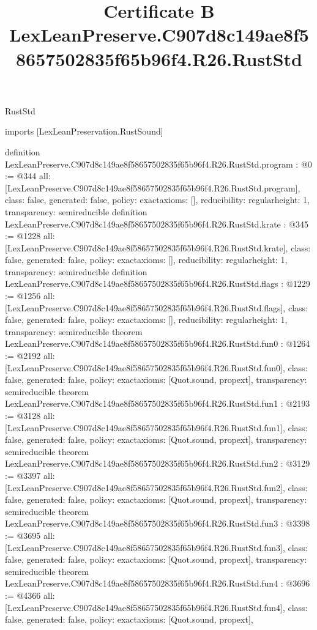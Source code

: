 \begin{lexlean}{RustStd}
\title{Certificate B LexLeanPreserve.C907d8c149ae8f58657502835f65b96f4.R26.RustStd}
\begin{coremodule}
imports [LexLeanPreservation.RustSound]

definition LexLeanPreserve.C907d8c149ae8f58657502835f65b96f4.R26.RustStd.program : @0 := @344 {
  all: [LexLeanPreserve.C907d8c149ae8f58657502835f65b96f4.R26.RustStd.program],
  class: false,
  generated: false,
  policy: exact{axioms: []},
  reducibility: regular{height: 1},
  transparency: semireducible
}
definition LexLeanPreserve.C907d8c149ae8f58657502835f65b96f4.R26.RustStd.krate : @345 := @1228 {
  all: [LexLeanPreserve.C907d8c149ae8f58657502835f65b96f4.R26.RustStd.krate],
  class: false,
  generated: false,
  policy: exact{axioms: []},
  reducibility: regular{height: 1},
  transparency: semireducible
}
definition LexLeanPreserve.C907d8c149ae8f58657502835f65b96f4.R26.RustStd.flags : @1229 := @1256 {
  all: [LexLeanPreserve.C907d8c149ae8f58657502835f65b96f4.R26.RustStd.flags],
  class: false,
  generated: false,
  policy: exact{axioms: []},
  reducibility: regular{height: 1},
  transparency: semireducible
}
theorem LexLeanPreserve.C907d8c149ae8f58657502835f65b96f4.R26.RustStd.fun0 : @1264 := @2192 {
  all: [LexLeanPreserve.C907d8c149ae8f58657502835f65b96f4.R26.RustStd.fun0],
  class: false,
  generated: false,
  policy: exact{axioms: [Quot.sound, propext]},
  transparency: semireducible
}
theorem LexLeanPreserve.C907d8c149ae8f58657502835f65b96f4.R26.RustStd.fun1 : @2193 := @3128 {
  all: [LexLeanPreserve.C907d8c149ae8f58657502835f65b96f4.R26.RustStd.fun1],
  class: false,
  generated: false,
  policy: exact{axioms: [Quot.sound, propext]},
  transparency: semireducible
}
theorem LexLeanPreserve.C907d8c149ae8f58657502835f65b96f4.R26.RustStd.fun2 : @3129 := @3397 {
  all: [LexLeanPreserve.C907d8c149ae8f58657502835f65b96f4.R26.RustStd.fun2],
  class: false,
  generated: false,
  policy: exact{axioms: [Quot.sound, propext]},
  transparency: semireducible
}
theorem LexLeanPreserve.C907d8c149ae8f58657502835f65b96f4.R26.RustStd.fun3 : @3398 := @3695 {
  all: [LexLeanPreserve.C907d8c149ae8f58657502835f65b96f4.R26.RustStd.fun3],
  class: false,
  generated: false,
  policy: exact{axioms: [Quot.sound, propext]},
  transparency: semireducible
}
theorem LexLeanPreserve.C907d8c149ae8f58657502835f65b96f4.R26.RustStd.fun4 : @3696 := @4366 {
  all: [LexLeanPreserve.C907d8c149ae8f58657502835f65b96f4.R26.RustStd.fun4],
  class: false,
  generated: false,
  policy: exact{axioms: [Quot.sound, propext]},
}
\end{coremodule}
\end{lexlean}
